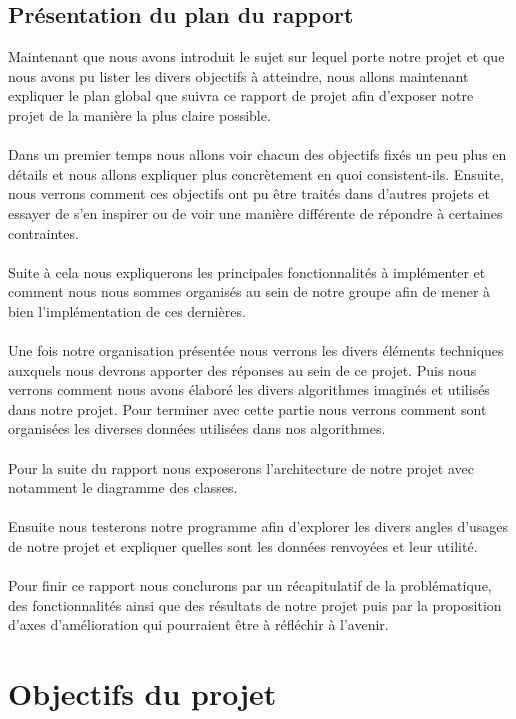 \documentclass[a4paper,12pt]{article}
\begin{document}
\subsection{Présentation du plan du rapport}
Maintenant que nous avons introduit le sujet sur lequel porte notre projet et que nous avons pu lister les divers objectifs à atteindre, nous allons maintenant expliquer le plan global que suivra ce rapport de projet afin d'exposer notre projet de la manière la plus claire possible.\\\\Dans un premier temps nous allons voir chacun des objectifs fixés un peu plus en détails et nous allons expliquer plus concrètement en quoi consistent-ils. Ensuite, nous verrons comment ces objectifs ont pu être traités dans d'autres projets et essayer de s'en inspirer ou de voir une manière différente de répondre à certaines contraintes.\\\\Suite à cela nous expliquerons les principales fonctionnalités à implémenter et comment nous nous sommes organisés au sein de notre groupe afin de mener à bien l'implémentation de ces dernières.\\\\Une fois notre organisation présentée nous verrons les divers éléments techniques auxquels nous devrons apporter des réponses au sein de ce projet. Puis nous verrons comment nous avons élaboré les divers algorithmes imaginés et utilisés dans notre projet. Pour terminer avec cette partie nous verrons comment sont organisées les diverses données utilisées dans nos algorithmes.\\\\Pour la suite du rapport nous exposerons l'architecture de notre projet avec notamment le diagramme des classes.\\\\Ensuite nous testerons notre programme afin d'explorer les divers angles d'usages de notre projet et expliquer quelles sont les données renvoyées et leur utilité.\\\\Pour finir ce rapport nous conclurons par un récapitulatif de la problématique, des fonctionnalités ainsi que des résultats de notre projet puis par la proposition d'axes d'amélioration qui pourraient être à réfléchir à l'avenir.


\section{Objectifs du projet}
\end{document}
